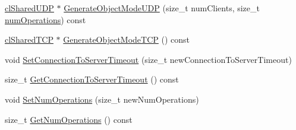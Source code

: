 \begin{DoxyCompactItemize}
\item 
\hyperlink{classcl_shared_u_d_p}{clSharedUDP} $\ast$ \hyperlink{classcl_instance_profile_a7c26ff26f8f318459787904be1269fd5}{GenerateObjectModeUDP} (size\_\-t numClients, size\_\-t \hyperlink{classcl_instance_profile_ac223cf65d4308e8f5c58472503e2ccab}{numOperations}) const 
\item 
\hyperlink{classcl_shared_t_c_p}{clSharedTCP} $\ast$ \hyperlink{classcl_instance_profile_a06adb082a4e1d4345b0ab00b8c014fcc}{GenerateObjectModeTCP} () const 
\item 
void \hyperlink{classcl_instance_profile_a40b4b09a772577e924ba6499fc1160dc}{SetConnectionToServerTimeout} (size\_\-t newConnectionToServerTimeout)
\item 
size\_\-t \hyperlink{classcl_instance_profile_a184afd75707fd393d3268d90fde4a76b}{GetConnectionToServerTimeout} () const 
\item 
void \hyperlink{classcl_instance_profile_ae477950943e877597648de949f8364bd}{SetNumOperations} (size\_\-t newNumOperations)
\item 
size\_\-t \hyperlink{classcl_instance_profile_a868718f63006b2ee181ba58d2df3b082}{GetNumOperations} () const 
\end{DoxyCompactItemize}
